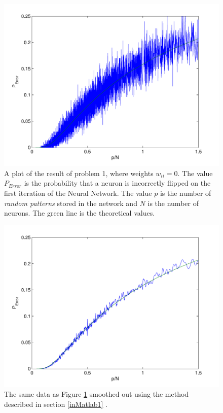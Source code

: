 \documentclass[12pt,a4paper]{article}
\begin{document}
\begin{figure}\centering
\includegraphics[width=12cm]{uppg1.pdf}
\caption{\label{uppg1} A plot of the result of problem 1, where weights $w_{ii} =
0$. The value $P_{Error}$ is the probability that a neuron is incorrectly
flipped on the first iteration of the Neural Network.  The value $p$ is the
number of \emph{random patterns} stored in the network and $N$ is the number
of neurons. The green line is the theoretical values.}
\end{figure}

\begin{figure}\centering
\includegraphics[width=12cm]{uppg1_smooth.pdf}
\caption{\label{uppg1_smooth} The same data as Figure \ref{uppg1} smoothed out using the method described in section \ref{inMatlab1} .}
\end{figure}
\end{document}
